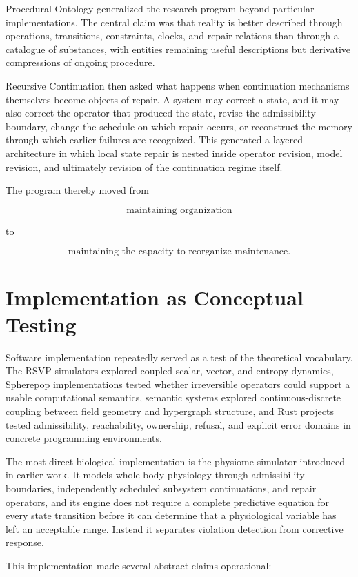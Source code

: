 \documentclass[11pt,oneside]{book}
\numberwithin{equation}{chapter}
\theoremstyle{definition}
\theoremstyle{plain}
\begin{document}
Procedural Ontology generalized the research program beyond particular implementations. The central claim was that reality is better described through operations, transitions, constraints, clocks, and repair relations than through a catalogue of substances, with entities remaining useful descriptions but derivative compressions of ongoing procedure.

Recursive Continuation then asked what happens when continuation mechanisms themselves become objects of repair. A system may correct a state, and it may also correct the operator that produced the state, revise the admissibility boundary, change the schedule on which repair occurs, or reconstruct the memory through which earlier failures are recognized. This generated a layered architecture in which local state repair is nested inside operator revision, model revision, and ultimately revision of the continuation regime itself.

The program thereby moved from

\[
\text{maintaining organization}
\]

to

\[
\text{maintaining the capacity to reorganize maintenance}.
\]

\section{Implementation as Conceptual Testing}

Software implementation repeatedly served as a test of the theoretical vocabulary. The RSVP simulators explored coupled scalar, vector, and entropy dynamics, Spherepop implementations tested whether irreversible operators could support a usable computational semantics, semantic systems explored continuous-discrete coupling between field geometry and hypergraph structure, and Rust projects tested admissibility, reachability, ownership, refusal, and explicit error domains in concrete programming environments.

The most direct biological implementation is the physiome simulator introduced in earlier work. It models whole-body physiology through admissibility boundaries, independently scheduled subsystem continuations, and repair operators, and its engine does not require a complete predictive equation for every state transition before it can determine that a physiological variable has left an acceptable range. Instead it separates violation detection from corrective response.

This implementation made several abstract claims operational:
\end{document}
